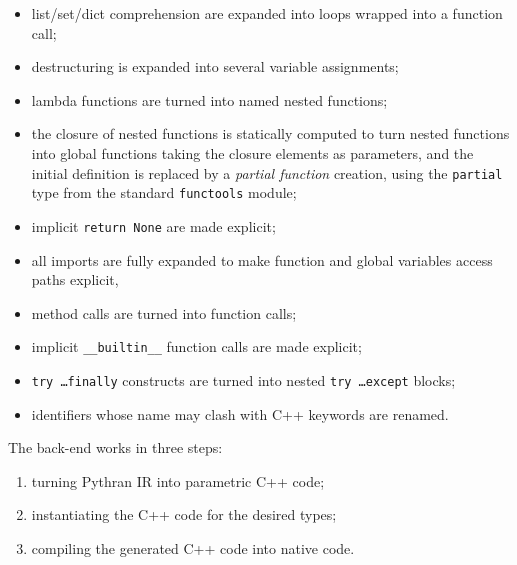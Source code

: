 \documentclass[10pt, onecolumn, preprint]{sigplanconf}
\begin{document}
\begin{itemize}
    \item list/set/dict comprehension are expanded into loops wrapped into a function call;

    \item destructuring is expanded into several variable assignments;

    \item lambda functions are turned into named nested functions;

    \item the closure of nested functions is statically computed to turn nested
        functions into global functions taking the closure elements as
        parameters, and the initial definition is replaced by a \emph{partial
        function} creation, using the \texttt{partial} type from the standard \texttt{functools} module;

    \item implicit \texttt{return None} are made explicit;

    \item all imports are fully expanded to make function and global variables access paths explicit,

    \item method calls are turned into function calls;

    \item implicit \texttt{\_\_builtin\_\_} function calls are made explicit;

    \item \texttt{try \dots finally} constructs are turned into nested \texttt{try \dots except} blocks;

    \item identifiers whose name may clash with C++ keywords are renamed.

\end{itemize}

The back-end works in three steps:

\begin{enumerate}

    \item turning Pythran IR into parametric C++ code;

    \item instantiating the C++ code for the desired types;

    \item compiling the generated C++ code into native code.

\end{enumerate}
\end{document}
